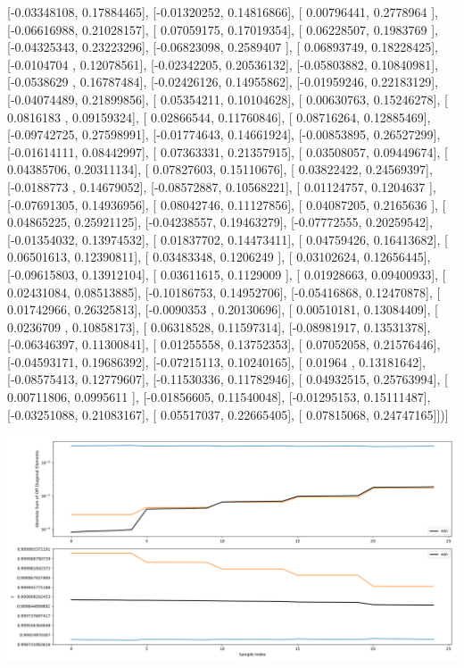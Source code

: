 \documentclass{article}
\begin{document}
       [-0.03348108,  0.17884465],
       [-0.01320252,  0.14816866],
       [ 0.00796441,  0.2778964 ],
       [-0.06616988,  0.21028157],
       [ 0.07059175,  0.17019354],
       [ 0.06228507,  0.1983769 ],
       [-0.04325343,  0.23223296],
       [-0.06823098,  0.2589407 ],
       [ 0.06893749,  0.18228425],
       [-0.0104704 ,  0.12078561],
       [-0.02342205,  0.20536132],
       [-0.05803882,  0.10840981],
       [-0.0538629 ,  0.16787484],
       [-0.02426126,  0.14955862],
       [-0.01959246,  0.22183129],
       [-0.04074489,  0.21899856],
       [ 0.05354211,  0.10104628],
       [ 0.00630763,  0.15246278],
       [ 0.0816183 ,  0.09159324],
       [ 0.02866544,  0.11760846],
       [ 0.08716264,  0.12885469],
       [-0.09742725,  0.27598991],
       [-0.01774643,  0.14661924],
       [-0.00853895,  0.26527299],
       [-0.01614111,  0.08442997],
       [ 0.07363331,  0.21357915],
       [ 0.03508057,  0.09449674],
       [ 0.04385706,  0.20311134],
       [ 0.07827603,  0.15110676],
       [ 0.03822422,  0.24569397],
       [-0.0188773 ,  0.14679052],
       [-0.08572887,  0.10568221],
       [ 0.01124757,  0.1204637 ],
       [-0.07691305,  0.14936956],
       [ 0.08042746,  0.11127856],
       [ 0.04087205,  0.2165636 ],
       [ 0.04865225,  0.25921125],
       [-0.04238557,  0.19463279],
       [-0.07772555,  0.20259542],
       [-0.01354032,  0.13974532],
       [ 0.01837702,  0.14473411],
       [ 0.04759426,  0.16413682],
       [ 0.06501613,  0.12390811],
       [ 0.03483348,  0.1206249 ],
       [ 0.03102624,  0.12656445],
       [-0.09615803,  0.13912104],
       [ 0.03611615,  0.1129009 ],
       [ 0.01928663,  0.09400933],
       [ 0.02431084,  0.08513885],
       [-0.10186753,  0.14952706],
       [-0.05416868,  0.12470878],
       [ 0.01742966,  0.26325813],
       [-0.0090353 ,  0.20130696],
       [ 0.00510181,  0.13084409],
       [ 0.0236709 ,  0.10858173],
       [ 0.06318528,  0.11597314],
       [-0.08981917,  0.13531378],
       [-0.06346397,  0.11300841],
       [ 0.01255558,  0.13752353],
       [ 0.07052058,  0.21576446],
       [-0.04593171,  0.19686392],
       [-0.07215113,  0.10240165],
       [ 0.01964   ,  0.13181642],
       [-0.08575413,  0.12779607],
       [-0.11530336,  0.11782946],
       [ 0.04932515,  0.25763994],
       [ 0.00711806,  0.0995611 ],
       [-0.01856605,  0.11540048],
       [-0.01295153,  0.15111487],
       [-0.03251088,  0.21083167],
       [ 0.05517037,  0.22665405],
       [ 0.07815068,  0.24747165]])]
\begin{center}
\includegraphics[scale=.9]{report_pickled_controls213/control_dpn_all.png}

\end{center}
\end{document}
